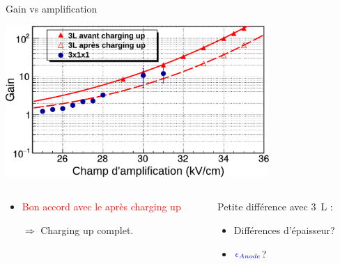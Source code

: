     \begin{frame}{Gain vs amplification}
        \begin{scriptsize}
            \centering \includegraphics[width=0.75\textwidth]{./pictures/gain_vs_ampli.pdf} \\
            \vspace{0.2cm}
            \begin{columns}
                \begin{column}{0.5\textwidth} 
                    \begin{itemize}
                        \item  \textcolor{red}{Bon accord avec le \threeL{} après charging up}
                        \item[$\Rightarrow$] Charging up complet.
                    \end{itemize}
                \end{column}
                \begin{column}{0.5\textwidth}
                    Petite différence avec \SI{3}{\liter} :
                    \begin{itemize}
                        \item Différences d'épaisseur? 
                        \item $\textcolor{blue}{\epsilon_{Anode}}$?
                    \end{itemize}
                \end{column}
            \end{columns}
        \end{scriptsize}
    \end{frame}
    
